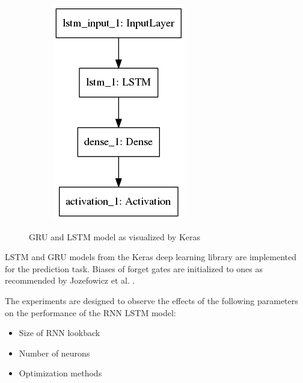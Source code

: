 \begin{figure}[H]
\begin{subfigure}{0.4\textwidth}
            \includegraphics[width=0.9\linewidth]{../images/model_lstm.png}
        \end{subfigure}
        \caption{GRU and LSTM model as visualized by Keras} \label{fig:models}
    \end{figure}
    LSTM and GRU models from the Keras deep learning library are implemented for the prediction task.
    Biases of forget gates are initialized to ones as recommended by Jozefowicz et al. \cite{JozefowiczZS15}.

    The experiments are designed to observe the effects of the following parameters on the performance of the RNN LSTM model:
    \begin{itemize}
        \item Size of RNN lookback
        \item Number of neurons
        \item Optimization methods
    \end{itemize}

